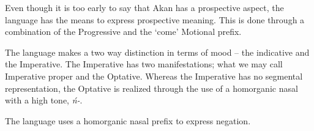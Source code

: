 \documentclass[output=paper]{langsci/langscibook}
\begin{document}
Even though it is too early to say that Akan has a prospective aspect, the language has the means to express prospective meaning. This is done through a combination of the Progressive and the `come' Motional prefix.

\ea
\label{ex:10.osam}
	\z

	\z
\z


The language makes a two way distinction in terms of mood -- the indicative and the Imperative. The Imperative has two manifestations; what we may call Imperative proper and the Optative. Whereas the Imperative has no segmental representation, the Optative is realized through the use of a homorganic nasal with a high tone, \textit{\'{n}-}. 

\ea
\label{ex:10.osam}
	\z

	\z
\z

The language uses a homorganic nasal prefix to express negation.

\ea
\label{ex:12.osam}
	\z

	\z
\z
\end{document}
